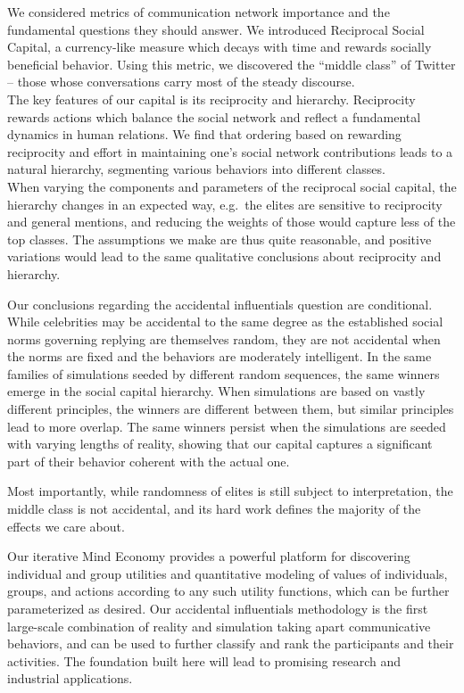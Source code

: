 \documentclass[10pt,oneside]{memoir}
\begin{document}
\begin{Spacing}{2}
We considered metrics of communication network importance and the fundamental questions they should answer. We introduced Reciprocal Social Capital, a currency-like measure which decays with time and rewards socially beneficial behavior. Using this metric, we discovered the ``middle class'' of Twitter -- those whose conversations carry most of the steady discourse. \\
The key features of our capital is its reciprocity and hierarchy.  Reciprocity rewards actions which balance the social network and reflect a fundamental dynamics in human relations.  We find that ordering based on rewarding reciprocity and effort in maintaining one's social network contributions leads to a natural hierarchy, segmenting various behaviors into different classes. \\
When varying the components and parameters of the reciprocal social capital, the hierarchy changes in an expected way, e.g.\ the elites are sensitive to reciprocity and general mentions, and reducing the weights of those would capture less of the top classes.  The assumptions we make are thus quite reasonable, and positive variations would lead to the same qualitative conclusions about reciprocity and hierarchy.


Our conclusions regarding the accidental influentials question are conditional.  While celebrities may be accidental to the same degree as the established  social norms governing replying are themselves random, they are not accidental when the norms are fixed and the behaviors are moderately intelligent.  In the same families of simulations seeded by different random sequences, the same winners emerge in the social capital hierarchy.  When simulations are based on vastly different principles, the winners are different between them, but similar principles lead to more overlap.  The same winners persist when the simulations are seeded with varying lengths of reality, showing that our capital captures a significant part of their behavior coherent with the actual one.


Most importantly, while randomness of elites is still subject to interpretation, the middle class is not accidental, and its hard work defines the majority of the effects we care about.


Our iterative Mind Economy provides a powerful platform for discovering individual and group utilities and quantitative modeling of values of individuals, groups, and actions according to any such utility functions, which can be further parameterized as desired.  Our accidental influentials methodology is the first large-scale combination of reality and simulation taking apart communicative behaviors, and can be used to further classify and rank the participants and their activities.   The foundation built here will lead to promising research and industrial applications.



\end{Spacing}
\end{document}
